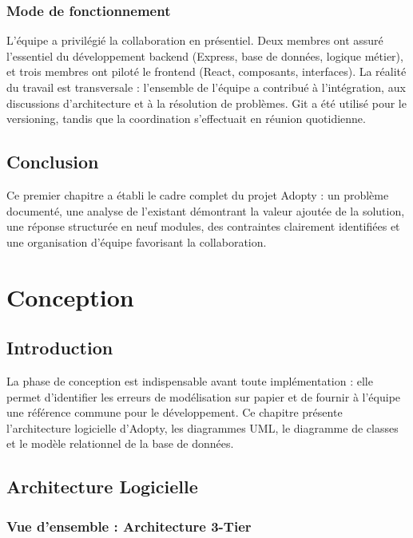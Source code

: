 \documentclass[12pt,a4paper]{report}
\begin{document}
\subsection*{Mode de fonctionnement}

L'équipe a privilégié la collaboration en présentiel. Deux membres ont assuré l'essentiel du développement backend (Express, base de données, logique métier), et trois membres ont piloté le frontend (React, composants, interfaces). La réalité du travail est transversale : l'ensemble de l'équipe a contribué à l'intégration, aux discussions d'architecture et à la résolution de problèmes. Git a été utilisé pour le versioning, tandis que la coordination s'effectuait en réunion quotidienne.

\section{Conclusion}

Ce premier chapitre a établi le cadre complet du projet Adopty : un problème documenté, une analyse de l'existant démontrant la valeur ajoutée de la solution, une réponse structurée en neuf modules, des contraintes clairement identifiées et une organisation d'équipe favorisant la collaboration.

\chapter{Conception}

\section{Introduction}

La phase de conception est indispensable avant toute implémentation : elle permet d'identifier les erreurs de modélisation sur papier et de fournir à l'équipe une référence commune pour le développement. Ce chapitre présente l'architecture logicielle d'Adopty, les diagrammes UML, le diagramme de classes et le modèle relationnel de la base de données.

\section{Architecture Logicielle}

\subsection{Vue d'ensemble : Architecture 3-Tier}
\end{document}
